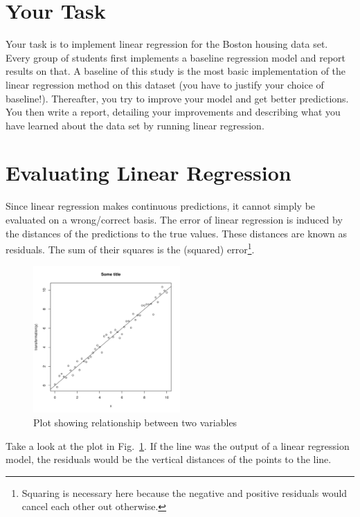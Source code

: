 \documentclass[11pt, leqno, a4paper]{article}
\begin{document}
\section{Your Task}

Your task is to implement linear regression for the Boston housing data set. Every group of students first implements a baseline regression model and report results on that. A baseline of this study is the most basic implementation of the linear regression method on this dataset (you have to justify your choice of 
baseline!). Thereafter, you try to improve your model and get better predictions. You then write a report, detailing your improvements and describing what you have learned about the data set by running linear regression.

\section{Evaluating Linear Regression}

Since linear regression makes continuous predictions, it cannot simply be evaluated on a wrong/correct
basis. The error of linear regression is induced by the distances of the predictions to the true values.
These distances are known as residuals. The sum of their squares is the (squared) error\footnote{Squaring
is necessary here because the negative and positive residuals would cancel each other out otherwise.}. 

\begin{figure}
    \begin{center}
    \includegraphics[width=0.5\textwidth]{plot.pdf}
    \end{center}
    \caption{Plot showing relationship between two variables\label{fig1}}
\end{figure}

Take a look at the plot in Fig.~\ref{fig1}. If the line was the output of a linear 
regression model, the residuals would be the vertical distances of the points to the line.
\end{document}
